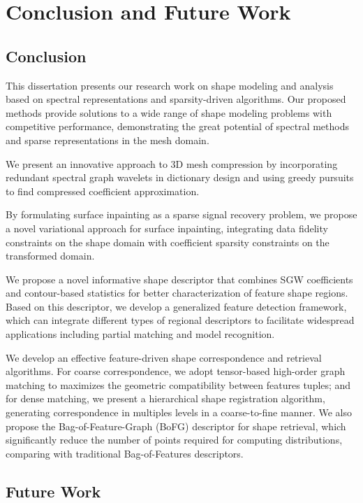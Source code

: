 \chapter{Conclusion and Future Work}

\section{Conclusion}
This dissertation presents our research work on shape modeling and
analysis based on spectral representations and sparsity-driven algorithms.
Our proposed methods provide solutions to a wide range of shape modeling
problems with competitive performance, demonstrating the great potential
of spectral methods and sparse representations in the mesh domain.

We present an innovative approach to 3D mesh compression
by incorporating redundant spectral graph wavelets in dictionary design and using
greedy pursuits to find compressed coefficient approximation.

By formulating surface inpainting as a sparse signal recovery problem,
we propose a novel variational approach for surface inpainting, integrating data fidelity
constraints on the shape domain with coefficient sparsity constraints on the
transformed domain.

We propose a novel informative shape descriptor that combines SGW coefficients and
contour-based statistics for better characterization of feature shape regions. Based on
this descriptor, we develop a generalized feature detection framework, which can integrate different
types of regional descriptors to facilitate widespread applications including partial matching and
model recognition.

We develop an effective feature-driven shape correspondence and retrieval
algorithms. For coarse correspondence, we adopt
tensor-based high-order graph matching to maximizes the
geometric compatibility between features tuples; and for dense matching,
we present a hierarchical shape registration algorithm, generating
correspondence in multiples levels in a coarse-to-fine manner. 
We also propose the Bag-of-Feature-Graph (BoFG) descriptor for shape retrieval, 
which significantly reduce the number of points required for computing 
distributions, comparing with traditional Bag-of-Features descriptors.

\section{Future Work}

